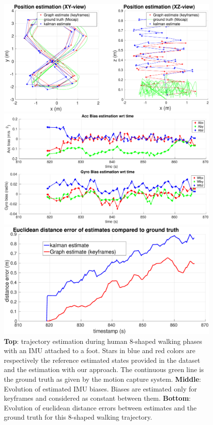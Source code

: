 \begin{figure}[tb]
\centering
\includegraphics[scale=0.175]{figures/experiments/8shape/XY_XZ_viewsRotated2.eps}
\par\vspace{3mm}
\includegraphics[scale=0.162]{figures/experiments/8shape/bias_only.eps}
\par\vspace{3mm}
\includegraphics[scale=0.161]{figures/experiments/8shape/euclidean_err.eps}
\caption{ 
{\bf Top}: trajectory estimation during human 8-shaped walking phases with an IMU attached to a foot. Stars in blue and red colors are respectively the reference estimated states provided in the dataset and the estimation with our approach.
The continuous green line is the ground truth as given by the motion capture system.
{\bf Middle}: Evolution of estimated IMU biases. Biases are estimated only for keyframes and considered as constant between them.
{\bf Bottom}: Evolution of euclidean distance errors between estimates and the ground truth for this 8-shaped walking trajectory.
}
\label{fig:8shape_walk}
\end{figure}


